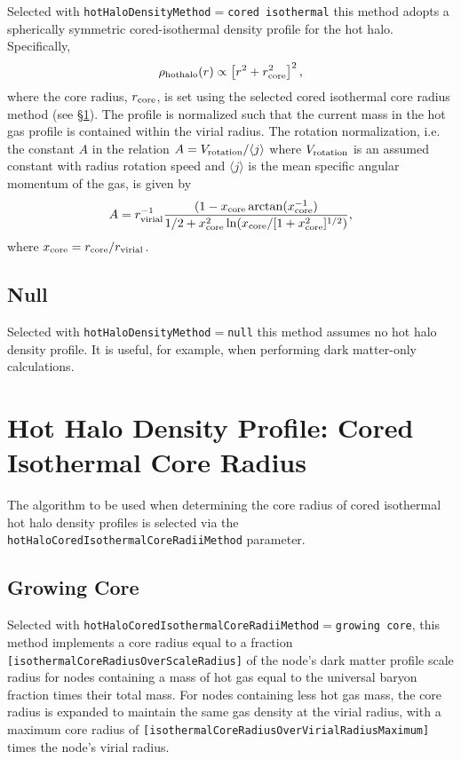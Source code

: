 Selected with {\tt hotHaloDensityMethod}$=${\tt cored isothermal} this method adopts a spherically symmetric cored-isothermal density profile for the hot halo. Specifically,
\begin{equation}
 \rho_{\rm hot halo}(r) \propto \left[ r^2 + r_{\rm core}^2 \right]^2,
\end{equation}
where the core radius, $r_{\rm core}$, is set using the selected cored isothermal core radius method (see \S\ref{sec:hotHaloDensityProfileCoredIsothermalCoreRadius}). The profile is normalized such that the current mass in the hot gas profile is contained within the virial radius. The rotation normalization, i.e. the constant $A$ in the relation $A = V_{\rm rotation}/\langle j \rangle$ where $V_{\rm rotation}$ is an assumed constant with radius rotation speed and $\langle j \rangle$ is the mean specific angular momentum of the gas, is given by
\begin{equation}
A = r_{\rm virial}^{-1} {(1-x_{\rm core}\arctan(x_{\rm core}^{-1}) \over 1/2 + x_{\rm core}^2 \ln(x_{\rm core}/[1+x_{\rm core}^2]^{1/2})},
\end{equation}
where $x_{\rm core}=r_{\rm core}/r_{\rm virial}$.

\subsection{Null}

Selected with {\tt hotHaloDensityMethod}$=${\tt null} this method assumes no hot halo density profile. It is useful, for example, when performing dark matter-only calculations.

\section{Hot Halo Density Profile: Cored Isothermal Core Radius}\label{sec:hotHaloDensityProfileCoredIsothermalCoreRadius}

The algorithm to be used when determining the core radius of cored isothermal hot halo density profiles is selected via the {\tt hotHaloCoredIsothermalCoreRadiiMethod} parameter.

\subsection{Growing Core}

Selected with {\tt hotHaloCoredIsothermalCoreRadiiMethod}$=${\tt growing core}, this method implements a core radius equal to a fraction {\tt [isothermalCoreRadiusOverScaleRadius]} of the node's dark matter profile scale radius for nodes containing a mass of hot gas equal to the universal baryon fraction times their total mass. For nodes containing less hot gas mass, the core radius is expanded to maintain the same gas density at the virial radius, with a maximum core radius of {\tt [isothermalCoreRadiusOverVirialRadiusMaximum]} times the node's virial radius.

